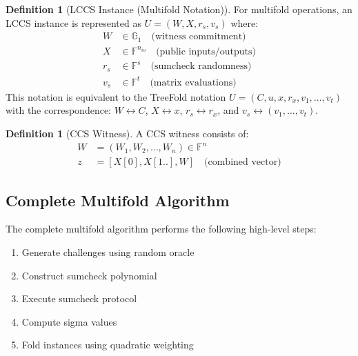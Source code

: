 \documentclass[11pt,a4paper]{article}
\theoremstyle{plain}
\theoremstyle{definition}
\newtheorem{definition}[theorem]{Definition}
\newcommand{\F}{\mathbb{F}}
\newcommand{\G}{\mathbb{G}}
\begin{document}
\begin{definition}[LCCS Instance (Multifold Notation)]
For multifold operations, an LCCS instance is represented as $U = (W, X, r_s, v_s)$ where:
\begin{align}
  W &\in \G_1 \quad \text{(witness commitment)} \\
  X &\in \F^{n_{io}} \quad \text{(public inputs/outputs)} \\
  r_s &\in \F^s \quad \text{(sumcheck randomness)} \\
  v_s &\in \F^t \quad \text{(matrix evaluations)}
\end{align}
This notation is equivalent to the TreeFold notation $U = (C, u, x, r_x, v_1, \ldots, v_t)$ with the correspondence: $W \leftrightarrow C$, $X \leftrightarrow x$, $r_s \leftrightarrow r_x$, and $v_s \leftrightarrow (v_1, \ldots, v_t)$.
\end{definition}

\begin{definition}[CCS Witness]
A CCS witness consists of:
\begin{align}
  W &= (W_1, W_2, \ldots, W_n) \in \F^n \\
  z &= [X[0], X[1..], W] \quad \text{(combined vector)}
\end{align}
\end{definition}

\subsection{Complete Multifold Algorithm}

The complete multifold algorithm performs the following high-level steps:
\begin{enumerate}
  \item Generate challenges using random oracle
  \item Construct sumcheck polynomial
  \item Execute sumcheck protocol
  \item Compute sigma values
  \item Fold instances using quadratic weighting
\end{enumerate}
\end{document}
